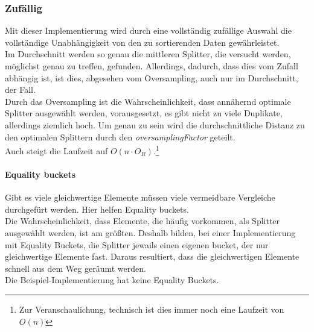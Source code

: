 		\subsubsection{Zufällig}
			\label{sec:random}
			
			Mit dieser Implementierung wird durch eine vollständig zufällige Auswahl die vollständige Unabhängigkeit von den zu sortierenden Daten gewährleistet.\\
			Im Durchschnitt werden so genau die mittleren Splitter, die versucht werden, möglichst genau zu treffen, gefunden.
			Allerdings, dadurch, dass dies vom Zufall abhängig ist, ist dies, abgesehen vom Oversampling, auch nur im Durchschnitt, der Fall.\\
			Durch das Oversampling ist die Wahrscheinlichkeit, dass annähernd optimale Splitter ausgewählt werden, vorausgesetzt, es gibt nicht zu viele Duplikate, allerdings ziemlich hoch.
			Um genau zu sein wird die durchschnittliche Distanz zu den optimalen Splittern durch den \textit{oversamplingFactor} geteilt.\\
			Auch steigt die Laufzeit auf $O(n\cdot O_R)$.\footnote{Zur Veranschaulichung, technisch ist dies immer noch eine Laufzeit von $O(n)$}

			\paragraph{Equality buckets}
				Gibt es viele gleichwertige Elemente müssen viele vermeidbare Vergleiche durchgefürt werden.
				Hier helfen Equality buckets.\\
				Die Wahrscheinlichkeit, dass Elemente, die häufig vorkommen, als Splitter ausgewählt werden, ist am größten.
				Deshalb bilden, bei einer Implementierung mit Equality Buckets, die Splitter jewails einen eigenen bucket, der nur gleichwertige Elemente fast.
				Daraus resultiert, dass die gleichwertigen Elemente schnell aus dem Weg geräumt werden.\\
				Die Beispiel-Implementierung hat keine Equality Buckets.

